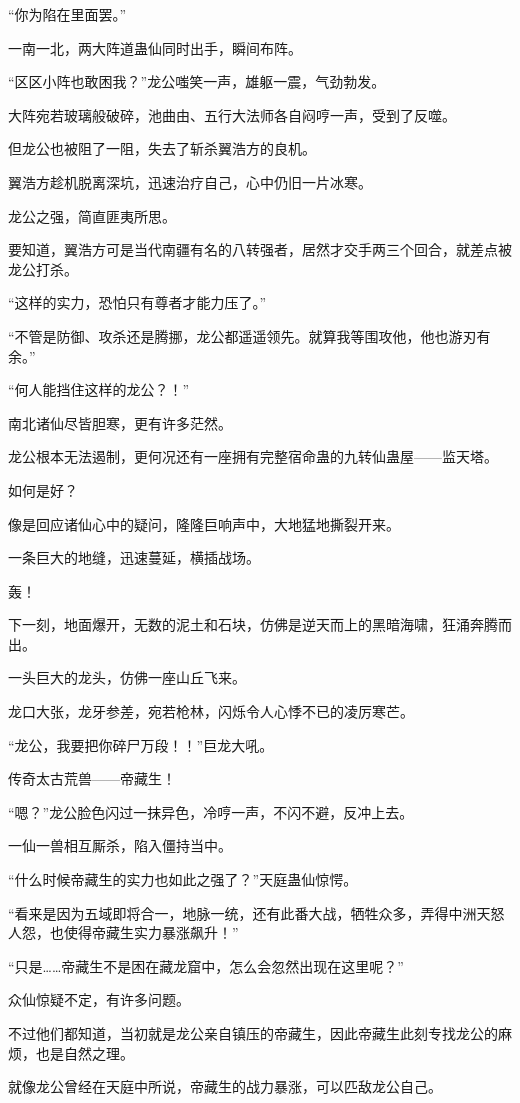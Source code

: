 \begin{this_body}
“你为陷在里面罢。”

一南一北，两大阵道蛊仙同时出手，瞬间布阵。

“区区小阵也敢困我？”龙公嗤笑一声，雄躯一震，气劲勃发。

大阵宛若玻璃般破碎，池曲由、五行大法师各自闷哼一声，受到了反噬。

但龙公也被阻了一阻，失去了斩杀翼浩方的良机。

翼浩方趁机脱离深坑，迅速治疗自己，心中仍旧一片冰寒。

龙公之强，简直匪夷所思。

要知道，翼浩方可是当代南疆有名的八转强者，居然才交手两三个回合，就差点被龙公打杀。

“这样的实力，恐怕只有尊者才能力压了。”

“不管是防御、攻杀还是腾挪，龙公都遥遥领先。就算我等围攻他，他也游刃有余。”

“何人能挡住这样的龙公？！”

南北诸仙尽皆胆寒，更有许多茫然。

龙公根本无法遏制，更何况还有一座拥有完整宿命蛊的九转仙蛊屋——监天塔。

如何是好？

像是回应诸仙心中的疑问，隆隆巨响声中，大地猛地撕裂开来。

一条巨大的地缝，迅速蔓延，横插战场。

轰！

下一刻，地面爆开，无数的泥土和石块，仿佛是逆天而上的黑暗海啸，狂涌奔腾而出。

一头巨大的龙头，仿佛一座山丘飞来。

龙口大张，龙牙参差，宛若枪林，闪烁令人心悸不已的凌厉寒芒。

“龙公，我要把你碎尸万段！！”巨龙大吼。

传奇太古荒兽——帝藏生！

“嗯？”龙公脸色闪过一抹异色，冷哼一声，不闪不避，反冲上去。

一仙一兽相互厮杀，陷入僵持当中。

“什么时候帝藏生的实力也如此之强了？”天庭蛊仙惊愕。

“看来是因为五域即将合一，地脉一统，还有此番大战，牺牲众多，弄得中洲天怒人怨，也使得帝藏生实力暴涨飙升！”

“只是……帝藏生不是困在藏龙窟中，怎么会忽然出现在这里呢？”

众仙惊疑不定，有许多问题。

不过他们都知道，当初就是龙公亲自镇压的帝藏生，因此帝藏生此刻专找龙公的麻烦，也是自然之理。

就像龙公曾经在天庭中所说，帝藏生的战力暴涨，可以匹敌龙公自己。


\end{this_body}
